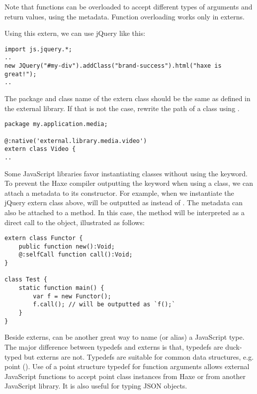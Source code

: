 Note that functions can be overloaded to accept different types of arguments and return values, using the  metadata. Function overloading works only in externs.

Using this extern, we can use jQuery like this:

\begin{lstlisting}
import js.jquery.*;
..
new JQuery("#my-div").addClass("brand-success").html("haxe is great!");
..
\end{lstlisting}

The package and class name of the extern class should be the same as defined in the external library. If that is not the case, rewrite the path of a class using .

\begin{lstlisting}
package my.application.media;

@:native('external.library.media.video')
extern class Video {
..
\end{lstlisting}

Some JavaScript libraries favor instantiating classes without using the  keyword. To prevent the Haxe compiler outputting the  keyword when using a class, we can attach a  metadata to its constructor. For example, when we instantiate the jQuery extern class above,  will be outputted as \expr{\$()} instead of . The  metadata can also be attached to a method. In this case, the method will be interpreted as a direct call to the object, illustrated as follows:

\begin{lstlisting}
extern class Functor {
	public function new():Void;
	@:selfCall function call():Void;
}

class Test {
	static function main() {
		var f = new Functor();
		f.call(); // will be outputted as `f();`
	}
}
\end{lstlisting}

Beside externs,  can be another great way to name (or alias) a JavaScript type. The major difference between typedefs and externs is that, typedefs are duck-typed but externs are not. Typedefs are suitable for common data structures, e.g. point (). Use of a point structure typedef for function arguments allows external JavaScript functions to accept point class instances from Haxe or from another JavaScript library. It is also useful for typing JSON objects.

